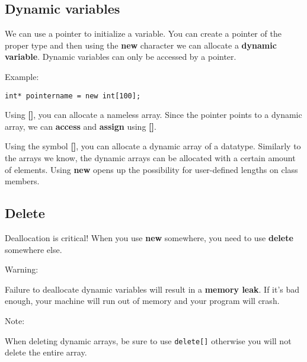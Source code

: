 \documentclass[11pt,a4paper,english]{paper}
\begin{document}
\bigskip

\subsection{Dynamic variables}

We can use a pointer to initialize a variable. You can create a pointer of the proper type and then using the \textbf{new} character we can allocate a \textbf{dynamic variable}. Dynamic variables can only be accessed by a pointer.


\bigskip 
\begin{bluebox}{Example:} {
    
    \texttt{int* pointername = new int[100];}

    \bigskip

    Using \textbf{[]}, you can allocate a nameless array. Since the pointer points to a dynamic array, we can \textbf{access} and \textbf{assign} using \textbf{[]}. 
  }
\end{bluebox}

\bigskip

\noindent Using the symbol \textbf{[]}, you can allocate a dynamic array of a datatype. Similarly to the arrays we know, the dynamic arrays can be allocated with a certain amount of elements. Using \textbf{new} opens up the possibility for user-defined lengths on class members.


\subsection{Delete}

Deallocation is critical! When you use \textbf{new} somewhere, you need to use \textbf{delete} somewhere else.

\bigskip
\begin{mybox}{Warning:} {

    Failure to deallocate dynamic variables will result in a \textbf{memory leak}. If it's bad enough, your machine will run out of memory and your program will crash.

  }

\end{mybox}
\begin{bluebox}{Note:} {

    When deleting dynamic arrays, be sure to use \texttt{delete[]} otherwise you will not delete the entire array.

  }
\end{bluebox}
\end{document}
